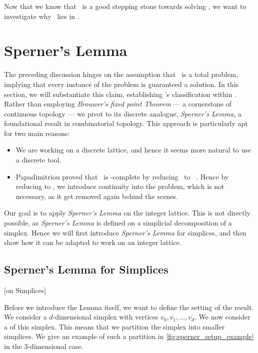 Now that we know that \Tarskistar\ is a good stepping stone towards solving \Tarski, we want to investigate why \Tarskistar\ lies in \PPAD.

\section{Sperner's Lemma}

The preceding discussion hinges on the assumption that \Tarskistar\ is a total problem, implying that every instance of the problem is guaranteed a solution. In this section, we will substantiate this claim, establishing \Tarskistar's classification within \TFNP. Rather than employing \textit{Brouwer's fixed point Theorem} --- a cornerstone of continuous topology --- we pivot to its discrete analogue, \textit{Sperner’s Lemma}, a foundational result in combinatorial topology. This approach is particularly apt for two main reasons:
\begin{itemize}
    \item We are working on a discrete lattice, and hence it seems more natural to use a discrete tool.
    \item Papadimitriou proved that \Brouwer\ is \PPAD-complete by reducing \Brouwer\ to \Sperner\ . Hence by reducing to \Brouwer, we introduce continuity into the problem, which is not necessary, as it get removed again behind the scenes.
\end{itemize}

Our goal is to apply \textit{Sperner's Lemma} on the integer lattice. This is not directly possible, as \textit{Sperner's Lemma} is defined on a simplicial decomposition of a simplex. Hence we will first introduce \textit{Sperner's Lemma} for simplices, and then show how it can be adapted to work on an integer lattice.

\subsection{Sperner's Lemma for Simplices}[on Simplices]

Before we introduce the Lemma itself, we want to define the setting of the result. We consider a $d$-dimensional simplex with vertices $v_0, v_1, \dots, v_d$. We now consider a  of this simplex. This means that we partition the simplex into smaller simplices. We give an example of such a partition in \cref{fig:sperner_setup_example} in the 3-dimensional case.

